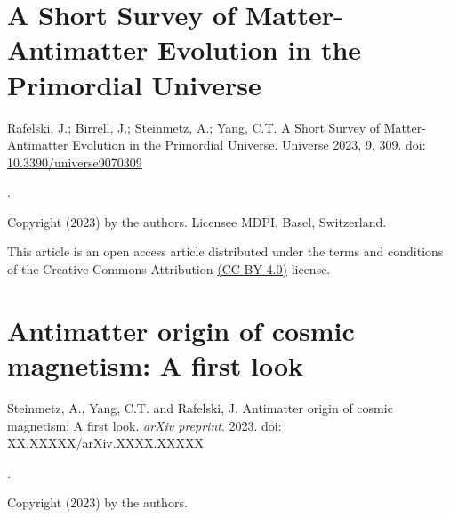 \chapter{A Short Survey of Matter-Antimatter Evolution in the Primordial Universe}
\label{appendixD}
\begin{center}
Rafelski, J.; Birrell, J.; Steinmetz, A.; Yang, C.T. A Short Survey of Matter-Antimatter Evolution in the Primordial Universe. Universe 2023, 9, 309.
doi: \href{https://doi.org/10.3390/universe9070309}{10.3390/universe9070309}

.

Copyright (2023) by the authors. Licensee MDPI, Basel, Switzerland.

This article is an open access article distributed under the terms and conditions of the Creative Commons Attribution \href{https://creativecommons.org/licenses/by/4.0/}{(CC BY 4.0)} license.

\end{center}


\chapter{Antimatter origin of cosmic magnetism: A first look}
\label{appendixE}
\begin{center}
Steinmetz, A., Yang, C.T. and Rafelski, J. Antimatter origin of cosmic magnetism: A first look. \emph{arXiv preprint}. 2023.
doi: XX.XXXXX/arXiv.XXXX.XXXXX

.

Copyright (2023) by the authors.

\end{center}
%
